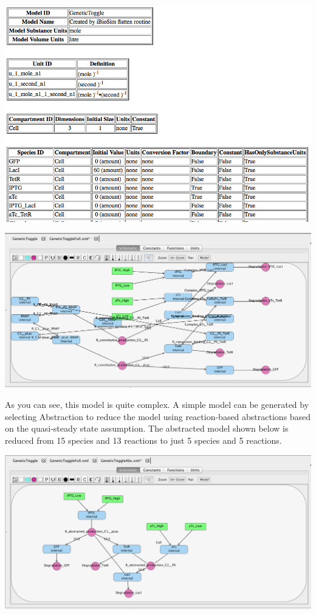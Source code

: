 \documentclass[titlepage,11pt]{article}
\begin{document}
\begin{center}
\includegraphics[width=160mm]{screenshots/viewBrowserGT}
\end{center}

\begin{center}
\includegraphics[width=160mm]{screenshots/reactionModelGT}
\end{center}

As you can see, this model is quite complex.  A simple model can be generated by selecting Abstraction to reduce the model using reaction-based abstractions based on the quasi-steady state assumption.  The abstracted model shown below is reduced from 15 species and 13 reactions to just 5 species and 5 reactions.  

\begin{center}
\includegraphics[width=160mm]{screenshots/reactionModelAbsGT}
\end{center}
\end{document}
